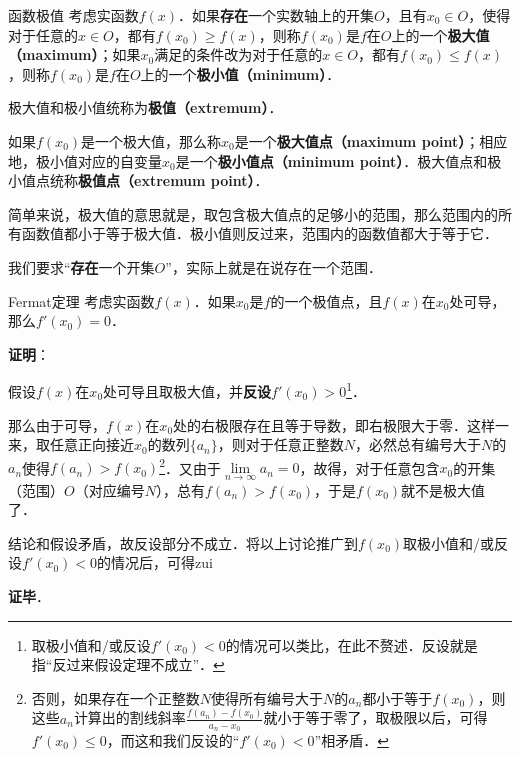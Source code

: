 

\begin{definition}{函数极值}
考虑实函数$f(x)$．如果\textbf{存在}一个实数轴上的开集$O$，且有$x_0\in O$，使得对于任意的$x\in O$，都有$f(x_0)\geq f(x)$，则称$f(x_0)$是$f$在$O$上的一个\textbf{极大值（maximum）}；如果$x_0$满足的条件改为对于任意的$x\in O$，都有$f(x_0)\leq f(x)$，则称$f(x_0)$是$f$在$O$上的一个\textbf{极小值（minimum）}．

极大值和极小值统称为\textbf{极值（extremum）}．

如果$f(x_0)$是一个极大值，那么称$x_0$是一个\textbf{极大值点（maximum point）}；相应地，极小值对应的自变量$x_0$是一个\textbf{极小值点（minimum point）}．极大值点和极小值点统称\textbf{极值点（extremum point）}．
\end{definition}


简单来说，极大值的意思就是，取包含极大值点的足够小的范围，那么范围内的所有函数值都小于等于极大值．极小值则反过来，范围内的函数值都大于等于它．

我们要求“\textbf{存在}一个开集$O$”，实际上就是在说存在一个范围．


\begin{theorem}{Fermat定理}
考虑实函数$f(x)$．如果$x_0$是$f$的一个极值点，且$f(x)$在$x_0$处可导，那么$f'(x_0)=0$．
\end{theorem}

\textbf{证明}：

假设$f(x)$在$x_0$处可导且取极大值，并\textbf{反设}$f'(x_0)>0$\footnote{取极小值和/或反设$f'(x_0)<0$的情况可以类比，在此不赘述．反设就是指“反过来假设定理不成立”．}．

那么由于可导，$f(x)$在$x_0$处的右极限存在且等于导数，即右极限大于零．这样一来，取任意正向接近$x_0$的数列$\{a_n\}$，则对于任意正整数$N$，必然总有编号大于$N$的$a_n$使得$f(a_n)>f(x_0)$\footnote{否则，如果存在一个正整数$N$使得所有编号大于$N$的$a_n$都小于等于$f(x_0)$，则这些$a_n$计算出的割线斜率$\frac{f(a_n)-f(x_0)}{a_n-x_0}$就小于等于零了，取极限以后，可得$f'(x_0)\leq 0$，而这和我们反设的“$f'(x_0)<0$”相矛盾．}．又由于$\lim\limits_{n\to\infty}a_n=0$，故得，对于任意包含$x_0$的开集（范围）$O$（对应编号$N$），总有$f(a_n)>f(x_0)$，于是$f(x_0)$就不是极大值了．

结论和假设矛盾，故反设部分不成立．将以上讨论推广到$f(x_0)$取极小值和/或反设$f'(x_0)<0$的情况后，可得zui

\textbf{证毕}．











